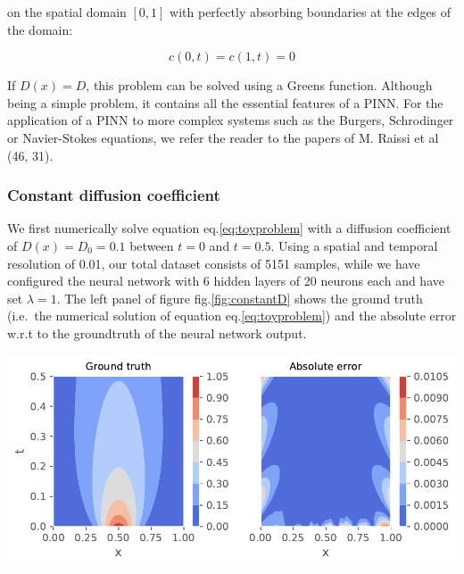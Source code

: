\documentclass{Dissertate}
\let\origfigure\figure
\let\endorigfigure\endfigure
\renewenvironment{figure}[1][2] {
    \expandafter\origfigure\expandafter[H]
} {
    \endorigfigure
}
\begin{document}
on the spatial domain \([0,1]\) with perfectly absorbing boundaries at
the edges of the domain:

\[
c(0,t) = c(1,t) = 0
\]

If \(D(x) = D\), this problem can be solved using a Greens function.
Although being a simple problem, it contains all the essential features
of a PINN. For the application of a PINN to more complex systems such as
the Burgers, Schrodinger or Navier-Stokes equations, we refer the reader
to the papers of M. Raissi et al (46, 31).

\hypertarget{constant-diffusion-coefficient}{%
\subsubsection{Constant diffusion
coefficient}\label{constant-diffusion-coefficient}}

We first numerically solve equation eq.\ref{eq:toyproblem} with a
diffusion coefficient of \(D(x) = D_0 = 0.1\) between \(t=0\) and
\(t=0.5\). Using a spatial and temporal resolution of 0.01, our total
dataset consists of 5151 samples, while we have configured the neural
network with 6 hidden layers of 20 neurons each and have set
\(\lambda=1\). The left panel of figure fig.\ref{fig:constantD} shows
the ground truth (i.e.~the numerical solution of equation
eq.\ref{eq:toyproblem}) and the absolute error w.r.t to the groundtruth
of the neural network output.

\begin{figure}
\hypertarget{fig:constantD}{%
\centering
\includegraphics{source/figures/pdf/error_constantD.pdf}
\caption{\textbf{Left panel}: Simulated ground truth of the problem.
\textbf{Right panel}: The absolute error of neural network. Note that
most of the error is located at areas with low concentration,
i.e.~signal.}\label{fig:constantD}
}
\end{figure}
\end{document}
